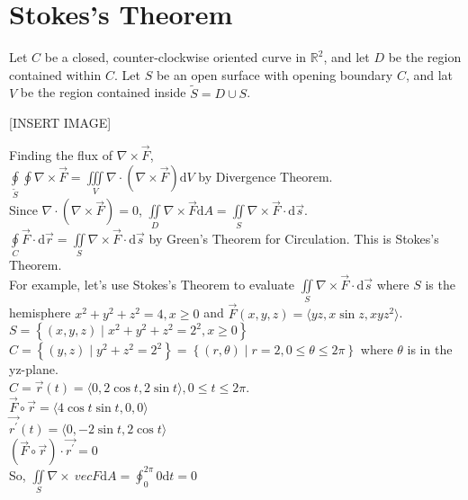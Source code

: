 \section{Stokes's Theorem}
\noindent
Let $C$ be a closed, counter-clockwise oriented curve in $\mathbb{R}^2$, and let $D$ be the region contained within $C$. Let $S$ be an open surface with opening boundary $C$, and lat $V$ be the region contained inside $\tilde{S} = D \cup S$.

[INSERT IMAGE]

\noindent
Finding the flux of $\nabla \times \vec{F}$,\\
$\oint\limits_{\tilde{S}}\oint{\nabla \times \vec{F}} = \iiint\limits_{V}{\nabla \cdot (\nabla \times \vec{F})\mathrm{d}V}$ by Divergence Theorem.\\
Since $\nabla \cdot (\nabla \times \vec{F}) = 0$, $\iint\limits_{D}{\nabla \times \vec{F}\mathrm{d}A} = \iint\limits_{S}{\nabla \times \vec{F} \cdot \mathrm{d}\vec{s}}$.\\
$\oint\limits_{C}{\vec{F} \cdot \mathrm{d}\vec{r}} = \iint\limits_{S}{\nabla \times \vec{F} \cdot \mathrm{d}\vec{s}}$ by Green's Theorem for Circulation. This is Stokes's Theorem.\\

\noindent
For example, let's use Stokes's Theorem to evaluate $\iint\limits_{S}{\nabla \times \vec{F} \cdot \mathrm{d}\vec{s}}$ where $S$ is the hemisphere $x^2 + y^2 + z^2 = 4, x \geq 0$ and $\vec{F}(x,y,z) = \langle yz, x\sin{z}, xyz^2 \rangle$.\\
\indent
$S = \left\{(x,y,z) \mid x^2 + y^2 + z^2 = 2^2, x \geq 0 \right\}$\\
\indent
$C = \left\{(y,z) \mid y^2 + z^2 = 2^2 \right\} = \left\{(r,\theta) \mid r = 2, 0 \leq \theta \leq 2\pi \right\}$ where $\theta$ is in the yz-plane.\\
\indent
$C = \vec{r}(t) = \langle 0, 2\cos{t}, 2\sin{t} \rangle, 0 \leq t \leq 2\pi$.\\
\indent
$\vec{F}\circ\vec{r} = \langle 4\cos{t}\sin{t}, 0, 0 \rangle$\\
\indent
$\vec{r^\prime}(t) = \langle 0, -2\sin{t}, 2\cos{t}\rangle$\\
\indent
$\left(\vec{F}\circ\vec{r}\right) \cdot \vec{r^\prime} = 0$\\
\indent
So, $\iint\limits_{S}{\nabla \times\ vec{F}\mathrm{d}A} = \oint_{0}^{2\pi}{0\mathrm{d}t} = 0$

